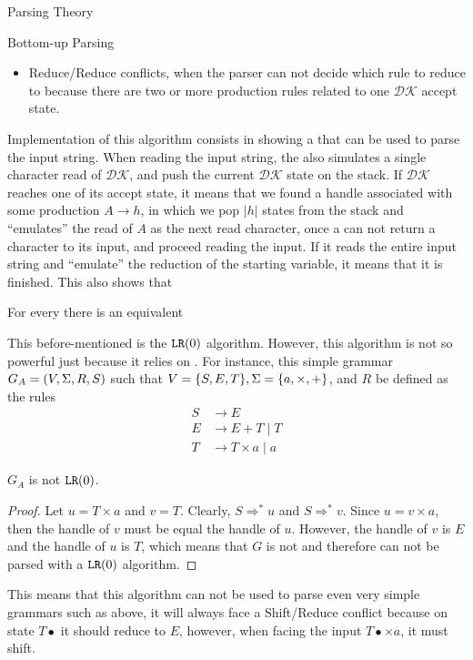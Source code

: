 \begin{section}{Parsing Theory}
\begin{subsection}{Bottom-up Parsing}
\begin{itemize}
	\item Reduce/Reduce conflicts, when the parser can not decide which
	rule to reduce to because there are two or more production rules
	related to one $\mathcal{DK}$ accept state.
\end{itemize}

Implementation of this algorithm consists in showing a \DPDA that
can be used to parse the input string. When reading the input string,
the \DPDA also simulates a single character read of $\mathcal{DK}$,
and push the current $\mathcal{DK}$ state on the stack. If
$\mathcal{DK}$ reaches one of its accept state, it means that we
found a handle associated with some production $A \rightarrow h$,
in which we pop $|h|$ states from the \DPDA stack and ``emulates''
the read of $A$ as the next read character, once a \DPDA can
not return a character to its input, and proceed reading the input.
If it reads the entire input string and ``emulate'' the reduction
of the starting variable, it means that it is finished. This also
shows that
\begin{lemma}
For every \DCFG there is an equivalent \DPDA
\end{lemma}

This before-mentioned \DPDA is the $\texttt{LR}(0)$ algorithm.
However, this algorithm is not so powerful just because it relies on
\DCFG. For instance, this simple grammar $G_A = (V, \Sigma, R, S)$ such that
$V = \{S, E, T\}, \Sigma = \{a, \times, +\}$, and $R$ be defined as the rules
\begin{align}
S &\rightarrow E \nonumber \\
E &\rightarrow E + T \; | \; T \nonumber \\
T &\rightarrow T \times a \; | \; a \nonumber
\end{align}

\begin{lemma}\label{shift_reduce}
	$G_A$ is not $\texttt{LR}(0)$.
\end{lemma}
\begin{proof}
	Let $u = T \times a$ and $v = T$. Clearly, $S \Rightarrow^* u$ and
	$S \Rightarrow^*v$. Since $u = v \times a$, then the handle of
	$v$ must be equal the handle of $u$. However, the handle of $v$
	is $E$ and the handle of $u$ is $T$, which means that $G$ is not
	 and therefore can not be parsed with a $\texttt{LR}(0)$
	algorithm.
\end{proof}

This means that this algorithm can not be used to parse even very simple
grammars such as above, it will always face a Shift/Reduce conflict
because on state $T\bullet$ it should reduce to $E$, however, when
facing the input $T\bullet \times a$, it must shift.


\end{subsection}
\end{section}
